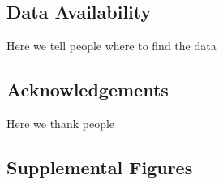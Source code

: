 \documentclass[
]{article}
\newcommand{\beginsupplement}{%
        \setcounter{table}{0}
        \renewcommand{\thetable}{S\arabic{table}}%
        \setcounter{figure}{0}
        \renewcommand{\thefigure}{S\arabic{figure}}%
     }
\begin{document}
\subsection{Data Availability}\label{data-availability}

Here we tell people where to find the data

\subsection{Acknowledgements}\label{acknowledgements}

Here we thank people

\pagebreak
\beginsupplement

\subsection{Supplemental Figures}\label{supplemental-figures}
\end{document}
